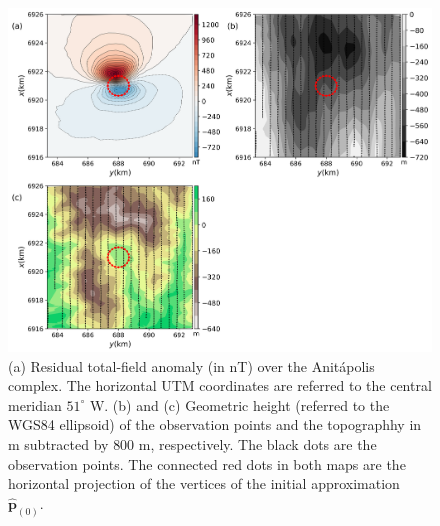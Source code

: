 \begin{figure}
    \centering
    \includegraphics[width=\linewidth]{figures/field_data_alt_topo.png}
    \caption{(a) Residual total-field anomaly (in nT) over the  
    Anit{\'a}polis complex. The horizontal UTM 
    coordinates are referred to the central meridian $ 51^\circ $ W. (b) and (c) Geometric 
    height (referred to the WGS84 ellipsoid) of the observation points and the topographhy in m subtracted by $ 800 $ m, respectively. 
    The black dots are the observation points. The connected red dots in both maps 
    are the horizontal projection of the vertices of the initial approximation $\hat{\mathbf{p}}_{(0)}$.}
    \label{fig:real_data}
\end{figure}

